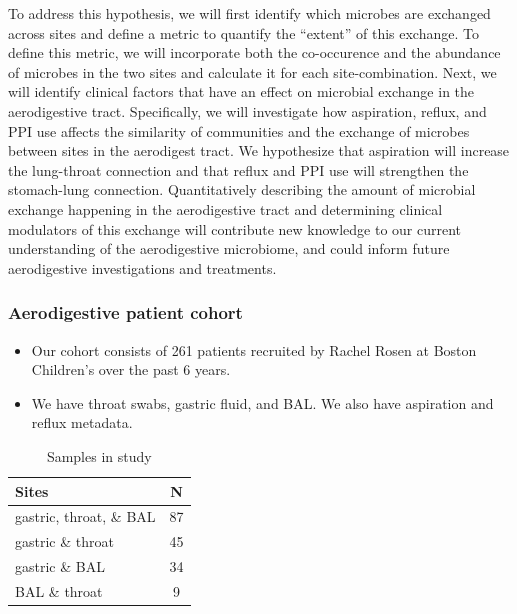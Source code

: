 \documentclass[12pt]{article}
\begin{document}
To address this hypothesis, we will first identify which microbes
are exchanged across sites and define a metric to quantify the ``extent'' of this exchange. 
To define this metric, we will incorporate both the co-occurence and the abundance
of microbes in the two sites and calculate it for each site-combination.
Next, we will identify clinical factors that have an effect on microbial
exchange in the aerodigestive tract. Specifically, we will investigate how aspiration,
reflux, and PPI use affects the similarity of communities and the
exchange of microbes between sites in the aerodigest tract.
We hypothesize that aspiration will increase the lung-throat connection and 
that reflux and PPI use will strengthen the stomach-lung connection.
Quantitatively describing the amount of microbial exchange happening in the
aerodigestive tract and determining clinical modulators of this exchange
will contribute new knowledge to our current understanding of the
aerodigestive microbiome, and could inform future aerodigestive
investigations and treatments.

\subsubsection{Aerodigestive patient cohort}

\begin{itemize}
\item Our cohort consists of 261 patients recruited by Rachel Rosen at Boston Children's over the past 6 years.
\item We have throat swabs, gastric fluid, and BAL. We also have aspiration and reflux metadata.
\end{itemize}

\begin{table}[H]
\begin{center}

\begin{tabular}{l c}
	\hline
	\textbf{Sites} & \textbf{N} \\
	\hline
	gastric, throat, \& BAL & 87 \\
	gastric \& throat & 45 \\
	gastric \& BAL & 34 \\
	BAL \& throat & 9 \\
	\hline 
\end{tabular}
\end{center}
\caption{Samples in study}\label{tab:rosen_samples}
\end{table}
\end{document}
